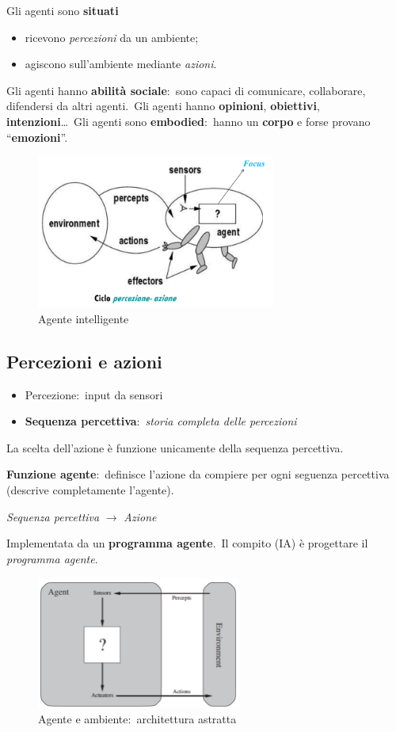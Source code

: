Gli agenti sono \textbf{situati}
\begin{itemize}
	\item  ricevono \textit{percezioni} da un ambiente;
	\item  agiscono sull'ambiente mediante \textit{azioni}.
\end{itemize}
Gli agenti hanno \textbf{abilità sociale}:\ sono capaci di comunicare, collaborare, difendersi da altri agenti.\
Gli agenti hanno \textbf{opinioni}, \textbf{obiettivi}, \textbf{intenzioni}\dots\
Gli agenti sono \textbf{embodied}:\ hanno un \textbf{corpo} e forse provano ``\textbf{emozioni}''.
\begin{figure}[H]
	\centering
	\includegraphics[width=0.7\textwidth]{immagini/Agenti_intelligenti2.png}
	\caption*{Agente intelligente}
\end{figure}
\subsection{Percezioni e azioni}
\begin{itemize}
	\item Percezione:\ input da sensori
	\item \textbf{Sequenza percettiva}:\ \textit{storia completa delle percezioni}
\end{itemize}
La scelta dell'azione è funzione unicamente della sequenza percettiva.

\textbf{Funzione agente}:\ definisce l'azione da compiere per ogni seguenza percettiva (descrive completamente l'agente).
\begin{center}
	\textit{Sequenza percettiva} $\rightarrow$ \textit{Azione}
\end{center}
Implementata da un \textbf{programma agente}.\
Il compito (IA) è progettare il \textit{programma agente}.
\begin{figure}[H]
	\centering
	\includegraphics[width=0.6\textwidth]{immagini/Agente.png}
	\caption*{Agente e ambiente:\ architettura astratta}
\end{figure}
